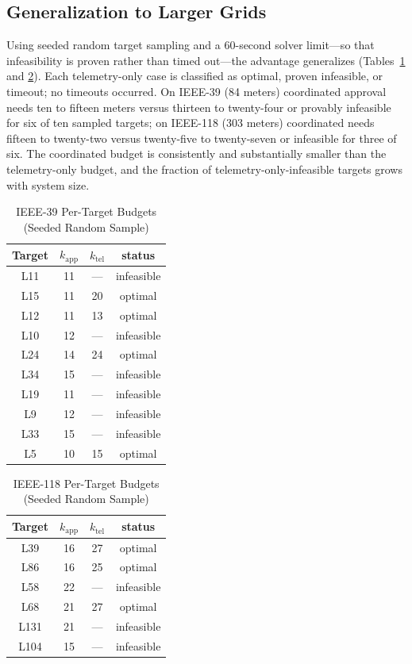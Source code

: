 \documentclass{ieeeaccess}
\begin{document}
\subsection{Generalization to Larger Grids}\label{sec:scale}
Using seeded random target sampling and a 60-second solver limit---so that infeasibility is proven rather than timed out---the advantage generalizes (Tables~\ref{tab:scale39} and \ref{tab:scale118}). Each telemetry-only case is classified as optimal, proven infeasible, or timeout; no timeouts occurred. On IEEE-39 (84 meters) coordinated approval needs ten to fifteen meters versus thirteen to twenty-four or provably infeasible for six of ten sampled targets; on IEEE-118 (303 meters) coordinated needs fifteen to twenty-two versus twenty-five to twenty-seven or infeasible for three of six. The coordinated budget is consistently and substantially smaller than the telemetry-only budget, and the fraction of telemetry-only-infeasible targets grows with system size.
\begin{table}[!t]\centering\caption{IEEE-39 Per-Target Budgets (Seeded Random Sample)}\label{tab:scale39}
\begin{tabular}{cccc}\toprule Target & $k_{\mathrm{app}}$ & $k_{\mathrm{tel}}$ & status\\\midrule
L11&11&---&infeasible\\L15&11&20&optimal\\L12&11&13&optimal\\L10&12&---&infeasible\\L24&14&24&optimal\\L34&15&---&infeasible\\L19&11&---&infeasible\\L9&12&---&infeasible\\L33&15&---&infeasible\\L5&10&15&optimal\\\bottomrule\end{tabular}\end{table}
\begin{table}[!t]\centering\caption{IEEE-118 Per-Target Budgets (Seeded Random Sample)}\label{tab:scale118}
\begin{tabular}{cccc}\toprule Target & $k_{\mathrm{app}}$ & $k_{\mathrm{tel}}$ & status\\\midrule
L39&16&27&optimal\\L86&16&25&optimal\\L58&22&---&infeasible\\L68&21&27&optimal\\L131&21&---&infeasible\\L104&15&---&infeasible\\\bottomrule\end{tabular}\end{table}
\end{document}
